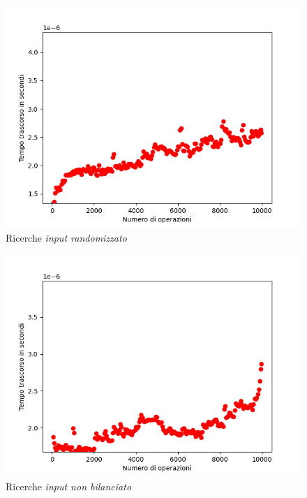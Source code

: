 \documentclass{article}
\begin{document}
			\begin{figure}[h!]
				\centering
				\includegraphics[scale = 0.8]{RBT_Searches}
				\caption{Ricerche \textit{input randomizzato}}
			\end{figure}
			\begin{figure}[h!]
				\centering
				\includegraphics[scale = 0.8]{RBT_Unbalanced_Searches}
				\caption{Ricerche \textit{input non bilanciato}}
			\end{figure}
\end{document}
